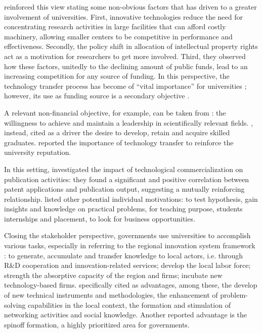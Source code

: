 \citet{Baldini2007} reinforced this view stating some non-obvious factors that has driven to a greater involvement of universities. First, innovative technologies reduce the need for concentrating research activities in large facilities that can afford costly machinery, allowing smaller centers to be competitive in performance and effectiveness. Secondly, the policy shift in allocation of intellectual property rights act as a motivation for researchers to get more involved. Third, they observed how these factors, unitedly to the declining amount of public funds, lead to an increasing competition for any source of funding. In this perspective, the technology transfer process has become of \enquote{vital importance} for universities \citep{Muscio2008}; however, its use as funding source is a secondary objective \citep{Jensen1998}.

A relevant non-financial objective, for example, can be taken from \citet{Tijssen2006}: the willingness to achieve and maintain a leadership in scientifically relevant fields. \citet{Leitch2005}, instead, cited as a driver the desire to develop, retain and acquire skilled graduates. \citet{Baldini2006} reported the importance of technology transfer to reinforce the university reputation. 

In this setting, \citet{Wong2010} investigated the impact of technological commercialization on publication activities: they found a significant and positive correlation between patent applications and publication output, suggesting a mutually reinforcing relationship. \citet{Lee2000} listed other potential individual motivations: to test hypothesis, gain insights and knowledge on practical problems, for teaching purpose, students internships and placement, to look for business opportunities. 

Closing the stakeholder perspective, governments use universities to accomplish various tasks, especially in referring to the regional innovation system framework \citep{Fritsch2007,Balderi2007}: to generate, accumulate and transfer knowledge to local actors, i.e. through R\&D cooperation and innovation-related services; develop the local labor force; strength the absorptive capacity of the region and firms; incubate new technology-based firms. \citet{AzagraCaro2010} specifically cited as advantages, among these, the develop of new technical instruments and methodologies, the enhancement of problem-solving capabilities in the local context, the formation and stimulation of networking activities and social knowledge. Another reported advantage is the spinoff formation, a highly prioritized area for governments.

